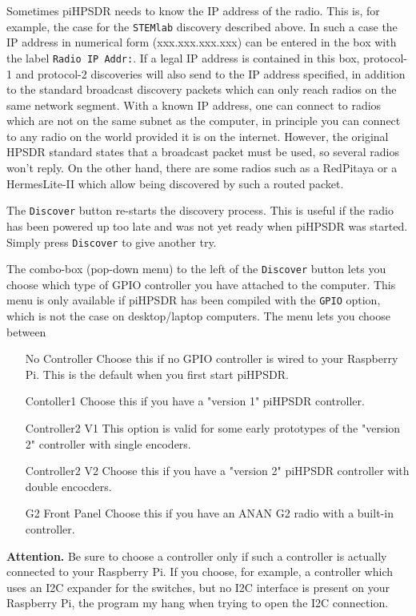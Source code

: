 \documentclass[12pt]{book}
\def\rett#1{\texttt{\color{red}#1}}
\begin{document}
Sometimes piHPSDR needs to know the IP address of the radio. This is, for example, the case for the \texttt{STEMlab} discovery
described above. In such a case the IP address in numerical form (xxx.xxx.xxx.xxx) can be entered in the box
with the label \rett{Radio IP Addr:}. If a legal IP address is contained in this box, protocol-1 and protocol-2 discoveries
will also send to the IP address specified, in addition to the standard broadcast discovery packets which can only reach
radios on the same network segment. With a known IP address,  one can
connect to radios which are not on the same subnet as the computer, in principle you can connect to any radio on the world
provided it is on the internet. However, the original HPSDR standard states that a broadcast packet must be used, so several
radios won't reply. On the other hand, there are some radios such as a RedPitaya or a HermesLite-II which allow being discovered
by such a routed packet. 

The \rett{Discover} button re-starts the discovery process. This is useful if the radio has been powered up too late and
was not yet ready when piHPSDR was started. Simply press \rett{Discover} to give another try.

The combo-box (pop-down menu) to the left of the \rett{Discover} button lets you choose which type of GPIO controller you
have attached to the computer. This menu is only available if piHPSDR has been compiled with the \texttt{GPIO} option, which
is not the case on desktop/laptop computers. The menu lets you choose between

\begin{itemize}[font=\texttt, left=80pt]
\item[No Controller]{Choose this if no GPIO controller is wired to your Raspberry Pi. This is the default when you first start piHPSDR.}
\item[Contoller1]{Choose this if you have a "version 1" piHPSDR controller.}
\item[Controller2 V1]{This option is valid for some early prototypes of the "version 2" controller with single encoders.}
\item[Controller2 V2]{Choose this if you have a "version 2" piHPSDR controller with double encocders.}
\item[G2 Front Panel]{Choose this if you have an ANAN G2 radio with a built-in controller.}
\end{itemize}

\textbf{Attention.} Be sure to choose a controller only if such a controller is actually connected to your Raspberry Pi. If
you choose, for example, a controller which uses an I2C expander for the switches, but no I2C interface is present on
your Raspberry Pi, the program my hang when trying to open the I2C connection.
\end{document}

